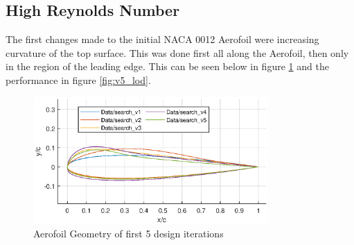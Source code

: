 \documentclass{article}
\begin{document}
\subsection{High Reynolds Number}

The first changes made to the initial NACA 0012 Aerofoil were increasing curvature of the top surface.
This was done first all along the Aerofoil, then only in the region of the leading edge.
This can be seen below in figure \ref{fig:v5_geometry} and the performance in figure \ref{fig:v5_lod}.

\begin{figure}[H]
    \centering
    \includegraphics[width=0.8\textwidth]{figures/hiRe_geometry_5.eps}
    \caption{Aerofoil Geometry of first 5 design iterations}
    \label{fig:v5_geometry}
\end{figure}
\end{document}
